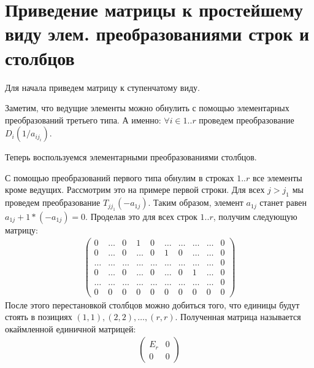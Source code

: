 \section{Приведение матрицы к простейшему виду элем. преобразованиями строк и столбцов}
Для начала приведем матрицу к ступенчатому виду. 

Заметим, что ведущие элементы можно обнулить с помощью элементарных преобразований третьего типа.
А именно: $\forall i \in 1..r$ проведем преобразование $D_i(1 / a_{ij_i})$.

Теперь воспользуемся элементарными преобразованиями столбцов. 

С помощью преобразований первого типа обнулим в строках $1..r$ все элементы кроме ведущих.
Рассмотрим это на примере первой строки. 
Для всех $j > j_1$ мы проведем преобразование $T_{jj_1}(-a_{1j})$.
Таким образом, элемент $a_{1j}$ станет равен $a_{1j} + 1 * (-a_{1j}) = 0$. 
Проделав это для всех строк $1..r$, получим следующую матрицу:
\begin{gather*}
    \begin{pmatrix}
        0 & \dots & 0 & 1 & 0 & \dots & \dots & \dots & \dots & 0 \\
        0 & \dots & 0 & \dots & 0 & 1 & 0 & \dots & \dots & 0 \\
        \dots & \dots & \dots & \dots & \dots & \dots & \dots & \dots & \dots & 0 \\
        0 & \dots & 0 & \dots & 0 & \dots & 0 & 1 & \dots & 0 \\
        \dots & \dots & \dots & \dots & \dots & \dots & \dots & \dots & \dots & 0 \\
       0 & 0 & 0 & 0 & 0 & 0 & 0 & 0 & 0 & 0
    \end{pmatrix}
\end{gather*}
После этого перестановкой столбцов можно добиться того, что единицы будут стоять в позициях $(1, 1), (2, 2), \dots, (r, r)$.
Полученная матрица называется окаймленной единичной матрицей:
\begin{gather*}
    \begin{pmatrix}
        E_r & 0 \\
        0 & 0
    \end{pmatrix}
\end{gather*}